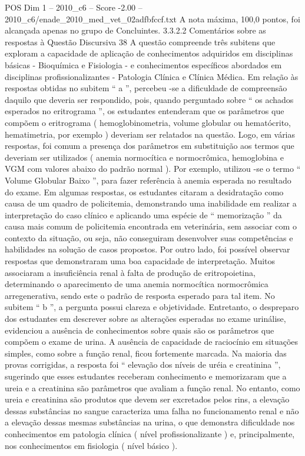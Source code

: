 \begin{textsample}{POS Dim 1 – 2010\_c6 – Score -2.00 – 2010\_c6/enade\_2010\_med\_vet\_02adfbfccf.txt}
A nota máxima, 100,0 pontos, foi alcançada apenas no grupo de Concluintes. 3.3.2.2 Comentários sobre as respostas à Questão Discursiva 38 A questão compreende três subitens que exploram a capacidade de aplicação de conhecimentos adquiridos em disciplinas básicas - Bioquímica e Fisiologia - e conhecimentos específicos abordados em disciplinas profissionalizantes - Patologia Clínica e Clínica Médica.
Em relação às respostas obtidas no subitem “ a ”, percebeu -se a dificuldade de compreensão daquilo que deveria ser respondido, pois, quando perguntado sobre “ os achados esperados no eritrograma ”, os estudantes entenderam que os parâmetros que compõem o eritrograma ( hemoglobinometria, volume globular ou hematócrito, hematimetria, por exemplo ) deveriam ser relatados na questão.
Logo, em várias respostas, foi comum a presença dos parâmetros em substituição aos termos que deveriam ser utilizados ( anemia normocítica e normocrômica, hemoglobina e VGM com valores abaixo do padrão normal ).
Por exemplo, utilizou -se o termo “ Volume Globular Baixo ”, para fazer referência à anemia esperada no resultado do exame.
Em algumas respostas, os estudantes citaram a desidratação como causa de um quadro de policitemia, demonstrando uma inabilidade em realizar a interpretação do caso clínico e aplicando uma espécie de “ memorização ” da causa mais comum de policitemia encontrada em veterinária, sem associar com o contexto da situação, ou seja, não conseguiram desenvolver suas competências e habilidades na solução de casos propostos.
Por outro lado, foi possível observar respostas que demonstraram uma boa capacidade de interpretação.
Muitos associaram a insuficiência renal à falta de produção de eritropoietina, determinando o aparecimento de uma anemia normocítica normocrômica arregenerativa, sendo este o padrão de resposta esperado para tal item.
No subitem “ b ”, a pergunta possui clareza e objetividade.
Entretanto, o despreparo dos estudantes em descrever sobre as alterações esperadas no exame urinálise, evidenciou a ausência de conhecimentos sobre quais são os parâmetros que compõem o exame de urina.
A ausência de capacidade de raciocínio em situações simples, como sobre a função renal, ficou fortemente marcada.
Na maioria das provas corrigidas, a resposta foi “ elevação dos níveis de uréia e creatinina ”, sugerindo que esses estudantes receberam conhecimento e memorizaram que a ureia e a creatinina são parâmetros que avaliam a função renal.
No entanto, como ureia e creatinina são produtos que devem ser excretados pelos rins, a elevação dessas substâncias no sangue caracteriza uma falha no funcionamento renal e não a elevação dessas mesmas substâncias na urina, o que demonstra dificuldade nos conhecimentos em patologia clínica ( nível profissionalizante ) e, principalmente, nos conhecimentos em fisiologia ( nível básico ).

\end{textsample}
